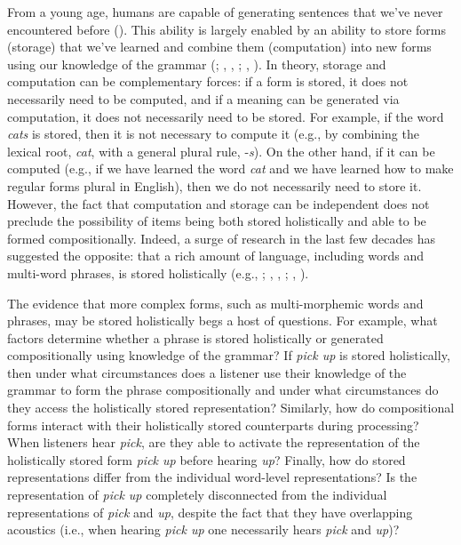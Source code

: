 \documentclass[
  12pt,
  letterpaper,
]{scrreprt}
\begin{document}
From a young age, humans are capable of generating sentences that we've
never encountered before
(). This
ability is largely enabled by an ability to store forms (storage) that
we've learned and combine them (computation) into new forms using our
knowledge of the grammar
(;
, ,
;
,
). In theory,
storage and computation can be complementary forces: if a form is
stored, it does not necessarily need to be computed, and if a meaning
can be generated via computation, it does not necessarily need to be
stored. For example, if the word \emph{cats} is stored, then it is not
necessary to compute it (e.g., by combining the lexical root,
\emph{cat}, with a general plural rule, -\emph{s}). On the other hand,
if it can be computed (e.g., if we have learned the word \emph{cat} and
we have learned how to make regular forms plural in English), then we do
not necessarily need to store it. However, the fact that computation and
storage can be independent does not preclude the possibility of items
being both stored holistically and able to be formed compositionally.
Indeed, a surge of research in the last few decades has suggested the
opposite: that a rich amount of language, including words and multi-word
phrases, is stored holistically (e.g., ; ,
,
;
,
).

The evidence that more complex forms, such as multi-morphemic words and
phrases, may be stored holistically begs a host of questions. For
example, what factors determine whether a phrase is stored holistically
or generated compositionally using knowledge of the grammar? If
\emph{pick up} is stored holistically, then under what circumstances
does a listener use their knowledge of the grammar to form the phrase
compositionally and under what circumstances do they access the
holistically stored representation? Similarly, how do compositional
forms interact with their holistically stored counterparts during
processing? When listeners hear \emph{pick}, are they able to activate
the representation of the holistically stored form \emph{pick up} before
hearing \emph{up}? Finally, how do stored representations differ from
the individual word-level representations? Is the representation of
\emph{pick up} completely disconnected from the individual
representations of \emph{pick} and \emph{up}, despite the fact that they
have overlapping acoustics (i.e., when hearing \emph{pick up} one
necessarily hears \emph{pick} and \emph{up})?
\end{document}
